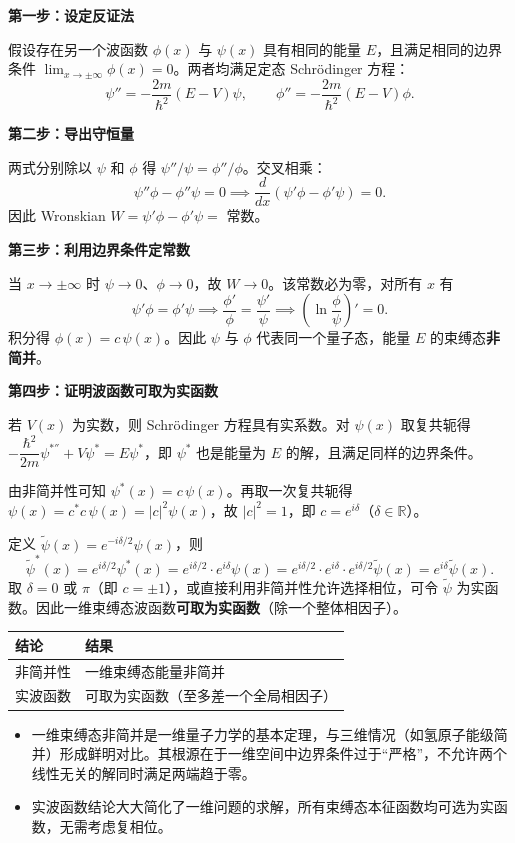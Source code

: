 \begin{derivationbox}[标准解题过程]
\textbf{第一步：设定反证法}

假设存在另一个波函数 $\phi(x)$ 与 $\psi(x)$ 具有相同的能量 $E$，且满足相同的边界条件 $\lim_{x\to\pm\infty}\phi(x)=0$。两者均满足定态 Schrödinger 方程：
\[
\psi''=-\frac{2m}{\hbar^2}(E-V)\psi,\qquad \phi''=-\frac{2m}{\hbar^2}(E-V)\phi.
\]

\textbf{第二步：导出守恒量}

两式分别除以 $\psi$ 和 $\phi$ 得 $\psi''/\psi=\phi''/\phi$。交叉相乘：
\[
\psi''\phi-\phi''\psi=0\implies\frac{d}{dx}(\psi'\phi-\phi'\psi)=0.
\]
因此 Wronskian $W=\psi'\phi-\phi'\psi=$ 常数。

\textbf{第三步：利用边界条件定常数}

当 $x\to\pm\infty$ 时 $\psi\to0$、$\phi\to0$，故 $W\to0$。该常数必为零，对所有 $x$ 有
\[
\psi'\phi=\phi'\psi\implies\frac{\phi'}{\phi}=\frac{\psi'}{\psi}\implies\left(\ln\frac{\phi}{\psi}\right)'=0.
\]
积分得 $\phi(x)=c\,\psi(x)$。因此 $\psi$ 与 $\phi$ 代表同一个量子态，能量 $E$ 的束缚态\textbf{非简并}。

\textbf{第四步：证明波函数可取为实函数}

若 $V(x)$ 为实数，则 Schrödinger 方程具有实系数。对 $\psi(x)$ 取复共轭得 $-\dfrac{\hbar^2}{2m}\psi^{*''}+V\psi^*=E\psi^*$，即 $\psi^*$ 也是能量为 $E$ 的解，且满足同样的边界条件。

由非简并性可知 $\psi^*(x)=c\,\psi(x)$。再取一次复共轭得 $\psi(x)=c^*c\,\psi(x)=|c|^2\psi(x)$，故 $|c|^2=1$，即 $c=e^{i\delta}$（$\delta\in\mathbb{R}$）。

定义 $\tilde\psi(x)=e^{-i\delta/2}\psi(x)$，则
\[
\tilde\psi^*(x)=e^{i\delta/2}\psi^*(x)=e^{i\delta/2}\cdot e^{i\delta}\psi(x)=e^{i\delta/2}\cdot e^{i\delta}\cdot e^{i\delta/2}\tilde\psi(x)=e^{i\delta}\tilde\psi(x).
\]
取 $\delta=0$ 或 $\pi$（即 $c=\pm1$），或直接利用非简并性允许选择相位，可令 $\tilde\psi$ 为实函数。因此一维束缚态波函数\textbf{可取为实函数}（除一个整体相因子）。
\end{derivationbox}

\begin{formulabox}[答案汇总]
\begin{center}
\begin{tabular}{ll}
\toprule
\textbf{结论} & \textbf{结果} \\
\midrule
非简并性 & 一维束缚态能量非简并 \\
实波函数 & 可取为实函数（至多差一个全局相因子） \\
\bottomrule
\end{tabular}
\end{center}
\end{formulabox}

\begin{insightbox}[物理图像]
\begin{itemize}
    \item 一维束缚态非简并是一维量子力学的基本定理，与三维情况（如氢原子能级简并）形成鲜明对比。其根源在于一维空间中边界条件过于``严格''，不允许两个线性无关的解同时满足两端趋于零。
    \item 实波函数结论大大简化了一维问题的求解，所有束缚态本征函数均可选为实函数，无需考虑复相位。
\end{itemize}
\end{insightbox}
